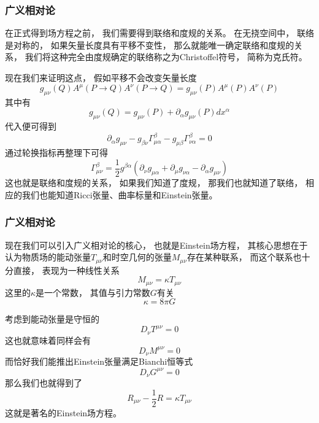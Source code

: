 \documentclass[8pt]{beamer}
\begin{document}
        \begin{frame}[fragile]
            \frametitle{广义相对论}
                \qquad
                在正式得到场方程之前，
                我们需要得到联络和度规的关系。
                在无挠空间中，
                联络是对称的，
                如果矢量长度具有平移不变性，
                那么就能唯一确定联络和度规的关系，
                我们将这种完全由度规确定的联络称之为Christoffel符号，
                简称为克氏符。

                \qquad
                现在我们来证明这点，
                假如平移不会改变矢量长度
                $$g_{\mu\nu}(Q)A^{\mu}(P\to Q)A^{\nu}(P \to Q)=g_{\mu\nu}(P)A^{\mu}(P)A^{\nu}(P)$$
                其中有
                $$g_{\mu\nu}(Q)=g_{\mu\nu}(P)+\partial_{\alpha}g_{\mu\nu}(P)dx^{\alpha}$$
                代入便可得到
                $$\partial_{\alpha}g_{\mu\nu}-g_{\beta\nu}\varGamma^{\beta}_{\mu\alpha}
                -g_{\mu\beta}\varGamma^{\beta}_{\nu\alpha}=0$$
                通过轮换指标再整理下可得
                $$\varGamma^{\beta}_{\mu\nu}=\frac{1}{2}g^{\beta\alpha }(
                    \partial_{\nu}g_{\mu\alpha}+\partial_{\mu}g_{\nu\alpha}-\partial_{\alpha}g_{\mu\nu}
                )$$
                这也就是联络和度规的关系，
                如果我们知道了度规，
                那我们也就知道了联络，
                相应的我们也能知道Ricci张量、曲率标量和Einstein张量。

        \end{frame}
        \begin{frame}[fragile]
            \frametitle{广义相对论}

                \qquad
                现在我们可以引入广义相对论的核心，
                也就是Einstein场方程，
                其核心思想在于认为物质场的能动张量$T_{\mu\nu}$和时空几何的张量$M_{\mu\nu}$存在某种联系，
                而这个联系也十分直接，
                表现为一种线性关系
                $$M_{\mu\nu}=\kappa T_{\mu\nu}$$
                这里的$\kappa$是一个常数，
                其值与引力常数$G$有关
                $$\kappa=8\pi G$$

                \qquad
                考虑到能动张量是守恒的
                $$D_{\nu}T^{\mu\nu}=0$$
                这也就意味着同样会有
                $$D_{\nu}M^{\mu\nu}=0$$
                而恰好我们能推出Einstein张量满足Bianchi恒等式
                $$D_{\nu}G^{\mu\nu}=0$$
                那么我们也就得到了
                $$R_{\mu\nu}-\frac{1}{2}R=\kappa T_{\mu\nu}$$
                这就是著名的Einstein场方程。

        \end{frame}
\end{document}
